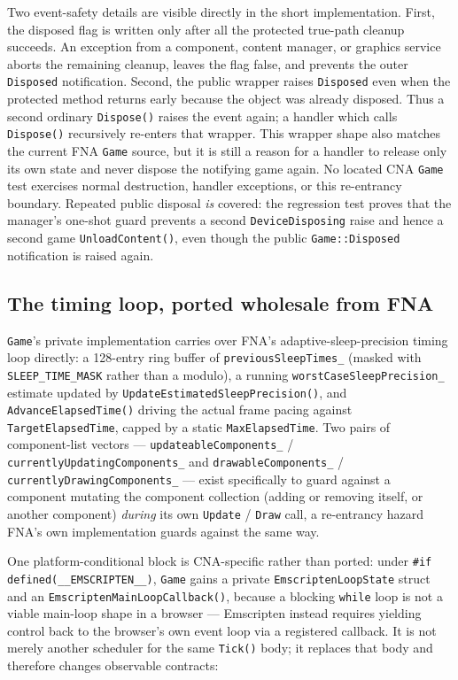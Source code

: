 Two event-safety details are visible directly in the short implementation. First, the disposed
flag is written only after all the protected true-path cleanup succeeds. An exception from a
component, content manager, or graphics service aborts the remaining cleanup, leaves the flag
false, and prevents the outer \texttt{Disposed} notification. Second, the public wrapper raises
\texttt{Disposed} even when the protected method returns early because the object was already
disposed. Thus a second ordinary \texttt{Dispose()} raises the event again; a handler which calls
\texttt{Dispose()} recursively re-enters that wrapper. This wrapper shape also matches the
current FNA \texttt{Game} source, but it is still a reason for a handler to release only its own
state and never dispose the notifying game again. No located CNA \texttt{Game} test exercises
normal destruction, handler exceptions, or this re-entrancy boundary. Repeated public disposal
\emph{is} covered: the regression test proves that the manager's one-shot guard prevents a second
\texttt{DeviceDisposing} raise and hence a second game \texttt{UnloadContent()}, even though the
public \texttt{Game::Disposed} notification is raised again.

\subsection{The timing loop, ported wholesale from FNA}

\texttt{Game}'s private implementation carries over FNA's adaptive-sleep-precision timing
loop directly: a 128-entry ring buffer of \texttt{previousSleepTimes\_} (masked with
\texttt{SLEEP\_TIME\_MASK} rather than a modulo), a running
\texttt{worstCaseSleepPrecision\_} estimate updated by \texttt{UpdateEstimatedSleepPrecision()},
and \texttt{AdvanceElapsedTime()} driving the actual frame pacing against
\texttt{TargetElapsedTime}, capped by a static \texttt{MaxElapsedTime}. Two pairs of
component-list vectors --- \texttt{updateableComponents\_} / \texttt{currentlyUpdatingComponents\_}
and \texttt{drawableComponents\_} / \texttt{currentlyDrawingComponents\_} --- exist specifically
to guard against a component mutating the component collection (adding or removing itself, or
another component) \emph{during} its own \texttt{Update} / \texttt{Draw} call, a re-entrancy
hazard FNA's own implementation guards against the same way.

One platform-conditional block is CNA-specific rather than ported: under
\texttt{\#if defined(\_\_EMSCRIPTEN\_\_)}, \texttt{Game} gains a private
\texttt{EmscriptenLoopState} struct and an \texttt{EmscriptenMainLoopCallback()}, because a
blocking \texttt{while} loop is not a viable main-loop shape in a browser --- Emscripten
instead requires yielding control back to the browser's own event loop via a registered
callback. It is not merely another scheduler for the same \texttt{Tick()} body; it replaces that
body and therefore changes observable contracts:


